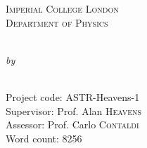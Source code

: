 
\begin{titlepage}

\vspace*{2cm}
\makeatletter
\center

\textsc{\Large Imperial College London}\\[0.2cm] 
\textsc{\large Department of Physics}\\[0.5cm] 

\vspace*{2cm}

\begin{Huge}
  \@title
\end{Huge}\\[0.1cm]
%
%
\emph{by}\\
\@author\\
%
\vspace*{3cm}

Project code: ASTR-Heavens-1\\
Supervisor: Prof. Alan \textsc{Heavens} \\ %
Assessor: Prof. Carlo \textsc{Contaldi} \\
Word count: 8256


\makeatother


\end{titlepage}

\newpage
\null
\thispagestyle{empty}
\newpage